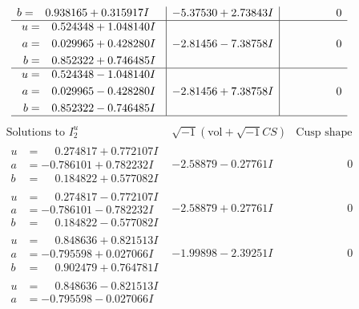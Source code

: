 \documentclass[1p]{elsarticle_modified}
\theoremstyle{definition}
\newcommand{\I}{\sqrt{-1}}
\begin{document}
$$\begin{array}{c|c|c}
\begin{aligned}
b &= \phantom{-}0.938165 + 0.315917 I\end{aligned}
 & -5.37530 + 2.73843 I & \phantom{-0.000000 } 0 \\ \hline\begin{aligned}
u &= \phantom{-}0.524348 + 1.048140 I \\
a &= \phantom{-}0.029965 + 0.428280 I \\
b &= \phantom{-}0.852322 + 0.746485 I\end{aligned}
 & -2.81456 - 7.38758 I & \phantom{-0.000000 } 0 \\ \hline\begin{aligned}
u &= \phantom{-}0.524348 - 1.048140 I \\
a &= \phantom{-}0.029965 - 0.428280 I \\
b &= \phantom{-}0.852322 - 0.746485 I\end{aligned}
 & -2.81456 + 7.38758 I & \phantom{-0.000000 } 0\\
 \hline 
 \end{array}$$\newpage$$\begin{array}{c|c|c}  
\text{Solutions to }I^u_{2}& \I (\text{vol} + \sqrt{-1}CS) & \text{Cusp shape}\\
 \hline 
\begin{aligned}
u &= \phantom{-}0.274817 + 0.772107 I \\
a &= -0.786101 + 0.782232 I \\
b &= \phantom{-}0.184822 + 0.577082 I\end{aligned}
 & -2.58879 - 0.27761 I & \phantom{-0.000000 } 0 \\ \hline\begin{aligned}
u &= \phantom{-}0.274817 - 0.772107 I \\
a &= -0.786101 - 0.782232 I \\
b &= \phantom{-}0.184822 - 0.577082 I\end{aligned}
 & -2.58879 + 0.27761 I & \phantom{-0.000000 } 0 \\ \hline\begin{aligned}
u &= \phantom{-}0.848636 + 0.821513 I \\
a &= -0.795598 + 0.027066 I \\
b &= \phantom{-}0.902479 + 0.764781 I\end{aligned}
 & -1.99898 - 2.39251 I & \phantom{-0.000000 } 0 \\ \hline\begin{aligned}
u &= \phantom{-}0.848636 - 0.821513 I \\
a &= -0.795598 - 0.027066 I \\

\end{aligned}
\end{array}$$
\end{document}
